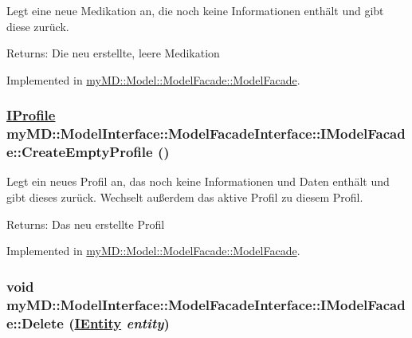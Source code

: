 Legt eine neue Medikation an, die noch keine Informationen enth\"{a}lt und gibt diese zur\"{u}ck. 

\begin{Desc}
\item[Returns:]Die neu erstellte, leere Medikation\end{Desc}


Implemented in \hyperlink{classmy_m_d_1_1_model_1_1_model_facade_1_1_model_facade_3fd69c99a27372f99eae3cda6e23e2e6}{my\-MD::Model::Model\-Facade::Model\-Facade}.\hypertarget{interfacemy_m_d_1_1_model_interface_1_1_model_facade_interface_1_1_i_model_facade_d81849285c0ecfe46b822095df995e8e}{
\subsubsection[CreateEmptyProfile]{\setlength{\rightskip}{0pt plus 5cm}\hyperlink{interfacemy_m_d_1_1_model_interface_1_1_data_model_interface_1_1_i_profile}{IProfile} my\-MD::Model\-Interface::Model\-Facade\-Interface::IModel\-Facade::Create\-Empty\-Profile ()}}
\label{de/d3e/interfacemy_m_d_1_1_model_interface_1_1_model_facade_interface_1_1_i_model_facade_d81849285c0ecfe46b822095df995e8e}


Legt ein neues Profil an, das noch keine Informationen und Daten enth\"{a}lt und gibt dieses zur\"{u}ck. Wechselt au\ss{}erdem das aktive Profil zu diesem Profil. 

\begin{Desc}
\item[Returns:]Das neu erstellte Profil\end{Desc}


Implemented in \hyperlink{classmy_m_d_1_1_model_1_1_model_facade_1_1_model_facade_d81849285c0ecfe46b822095df995e8e}{my\-MD::Model::Model\-Facade::Model\-Facade}.\hypertarget{interfacemy_m_d_1_1_model_interface_1_1_model_facade_interface_1_1_i_model_facade_1ec3022b27f9091440cb495f510d25b0}{
\subsubsection[Delete]{\setlength{\rightskip}{0pt plus 5cm}void my\-MD::Model\-Interface::Model\-Facade\-Interface::IModel\-Facade::Delete (\hyperlink{interfacemy_m_d_1_1_model_interface_1_1_data_model_interface_1_1_i_entity}{IEntity} {\em entity})}}
\label{de/d3e/interfacemy_m_d_1_1_model_interface_1_1_model_facade_interface_1_1_i_model_facade_1ec3022b27f9091440cb495f510d25b0}


